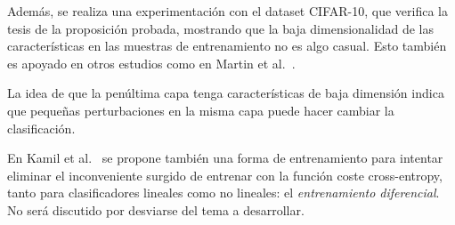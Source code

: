 Además, se realiza una experimentación con el dataset CIFAR-10, que verifica la tesis de la proposición probada, mostrando que la baja dimensionalidad de las características en las muestras de entrenamiento no es algo casual. Esto también es apoyado en otros estudios como en Martin et al.~\cite{SupportLossFunc}.

La idea de que la penúltima capa tenga características de baja dimensión indica que pequeñas perturbaciones en la misma capa puede hacer cambiar la clasificación.

En Kamil et al.~\cite{LossFunc} se propone también una forma de entrenamiento para intentar eliminar el inconveniente surgido de entrenar con la función coste cross-entropy, tanto para clasificadores lineales como no lineales: el \textit{entrenamiento diferencial}. No será discutido por desviarse del tema a desarrollar.








